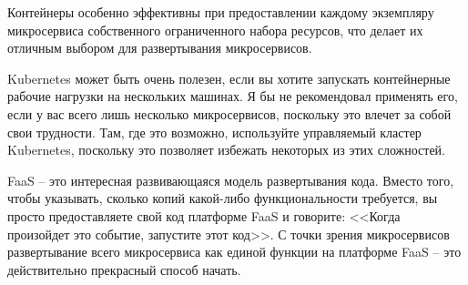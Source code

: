 \documentclass[%
	11pt,
	a4paper,
	utf8,
		]{article}
\begin{document}
Контейнеры особенно эффективны при предоставлении каждому экземпляру микросервиса собственного ограниченного набора ресурсов, что делает их отличным выбором для развертывания микросервисов.

Kubernetes может быть очень полезен, если вы хотите запускать контейнерные рабочие нагрузки на нескольких машинах. {\color{red}Я бы не рекомендовал применять его, если у вас всего лишь несколько микросервисов, поскольку это влечет за собой свои трудности.} Там, где это возможно, используйте управляемый кластер Kubernetes, поскольку это позволяет избежать некоторых из этих сложностей.

FaaS -- это интересная развивающаяся модель развертывания кода. Вместо того, чтобы указывать, сколько копий какой-либо функциональности требуется, вы просто предоставляете свой код платформе FaaS и говорите: <<Когда произойдет это событие, запустите этот код>>. С точки зрения микросервисов развертывание всего микросервиса как единой функции на платформе FaaS -- это действительно прекрасный способ начать.






\begin{thebibliography}{99}
	
	
\end{thebibliography}


\end{document}
